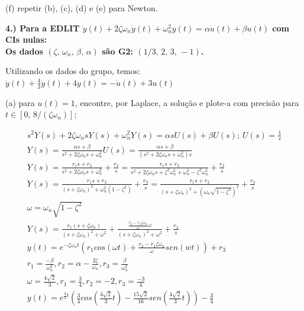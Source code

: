 \documentclass[10pt]{article}
\begin{document}
(f) repetir (b), (c), (d) e (e) para Newton.

\vspace{\baselineskip}


\textbf{4.) Para a EDLIT $\ddot{y}(t) + 2\zeta \omega_n \dot{y}(t) + \omega_n^2 y(t) = \alpha \dot{u}(t) + \beta u(t)$ com CIs nulas:\\
Os dados $(\zeta,\, \omega_n,\, \beta,\, \alpha)$ são \textbf{G2: }$(1/3,\, 2,\, 3,\, -1)$.}

Utilizando os dados do grupo, temos: $\ddot{y}(t) + \frac{4}{3} \dot{y}(t) + 4 y(t) = -\dot{u}(t) + 3u(t)$

(a) para $u(t) = 1$, encontre, por Laplace, a solução e plote-a com precisão para $t \in [0,\, 8/(\zeta \omega_n)]$;

\begin{align*}
    s^2Y(s) + 2\zeta \omega_n sY(s) + \omega_n^2 Y(s) = \alpha sU(s) + \beta U(s); \ U(s) = \frac{1}{s} \\
    Y(s) = \frac{\alpha s + \beta}{s^2 + 2\zeta \omega_n s + \omega_n^2} U(s) = \frac{\alpha s + \beta}{(s^2 + 2\zeta \omega_n s + \omega_n^2)s} \\
    Y(s) = \frac{r_1 s + r_2}{s^2 + 2\zeta \omega_n s + \omega_n^2} + \frac{r_3}{s} = \frac{r_1 s + r_2}{s^2 + 2\zeta \omega_n s + \zeta^2 \omega_n^2 + \omega_n^2 - \zeta^2 \omega_n^2} + \frac{r_3}{s} \\
    Y(s) = \frac{r_1 s + r_2}{(s + \zeta \omega_n)^2 + \omega_n^2 (1 - \zeta^2)} + \frac{r_3}{s} = \frac{r_1 s + r_2}{(s + \zeta \omega_n)^2 + (\omega_n \sqrt{1 - \zeta^2})^2} + \frac{r_3}{s} \\
    \omega = \omega_n \sqrt{1 - \zeta^2} \\
    Y(s) = \frac{r_1(s + \zeta \omega_n)}{(s + \zeta \omega_n)^2 + \omega^2} + \frac{\frac{r_2 - r_1 \zeta \omega_n}{\omega} \omega}{(s + \zeta \omega_n)^2 + \omega^2} + \frac{r_3}{s} \\
    y(t) = e^{- \zeta \omega_n t}(r_1 cos(\omega t) + \frac{r_2 - r_1 \zeta \omega_n}{\omega}sen(wt)) + r_3 \\
    r_1 = \frac{-\beta}{\omega_n^2}, r_2 = \alpha - \frac{2 \zeta}{\omega_n}, r_3 = \frac{\beta}{\omega_n^2} \\
    \omega = \frac{4 \sqrt{2}}{3}, r_1 = \frac{3}{4}, r_2 = -2, r_3 = \frac{-3}{4} \\
    y(t) = e^{\frac{2}{3}t} \left( \frac{3}{4}cos\left(\frac{4 \sqrt{2}}{3}t\right) - \frac{15 \sqrt{2}}{16} sen\left(\frac{4 \sqrt{2}}{3}t\right)\right) - \frac{3}{4} \\
\end{align*}
\end{document}
